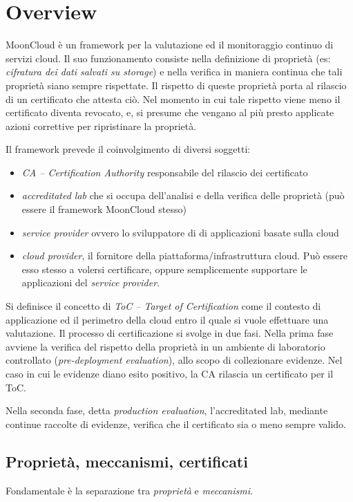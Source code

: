 \section{Overview}\label{sec:mooncloud-overview}
MoonCloud è un framework per la valutazione ed il monitoraggio continuo
di servizi cloud.
Il suo funzionamento consiste nella definizione di proprietà (es: \textit{cifratura
dei dati salvati su storage}) e nella verifica in maniera continua che tali
proprietà siano sempre rispettate. Il rispetto di queste proprietà porta al
rilascio di un certificato che attesta ciò. Nel momento in cui
tale rispetto viene meno il certificato diventa revocato, e, si presume
che vengano al più presto applicate azioni correttive per ripristinare
la proprietà.


Il framework prevede il coinvolgimento di diversi soggetti:
\begin{itemize}
	\item \textit{CA -- Certification Authority} responsabile del
	      rilascio dei certificato
	\item \textit{accreditated lab} che si occupa dell'analisi e della
	      verifica delle proprietà (può essere il framework MoonCloud stesso)
	\item \textit{service provider} ovvero lo sviluppatore di di applicazioni
	      basate sulla cloud
	\item \textit{cloud provider}, il fornitore della piattaforma/infrastruttura
	      cloud. Può essere esso stesso a volersi certificare, oppure semplicemente
	      supportare le applicazioni del \textit{service provider}.
\end{itemize}

Si definisce il concetto di \textit{ToC -- Target of Certification} come il
contesto di applicazione ed il perimetro della cloud entro il quale
si vuole effettuare una valutazione.
Il processo di certificazione si svolge in due fasi. Nella prima fase
avviene la verifica del rispetto della proprietà in un ambiente di
laboratorio controllato (\textit{pre-deployment evaluation}), allo scopo
di collezionare evidenze.
Nel caso in cui le evidenze diano esito positivo, la CA rilascia
un certificato per il ToC.

Nella seconda fase, detta \textit{production evaluation}, l'accreditated
lab, mediante continue raccolte di evidenze, verifica che il certificato sia o meno
sempre valido.

\subsection{Proprietà, meccanismi, certificati}
Fondamentale è la separazione tra \textit{proprietà} e \textit{meccanismi}.

